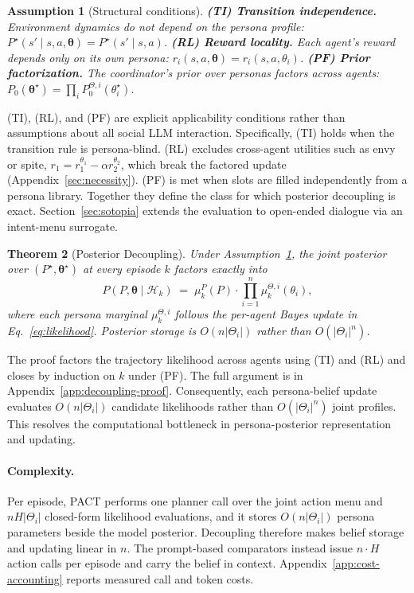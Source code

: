 \documentclass[letterpaper]{article} %
\newtheorem{theorem}{Theorem}[section]
\newtheorem{assumption}[theorem]{Assumption}
\begin{document}
\begin{assumption}[Structural conditions]
\label{ass:struct}
\textbf{(TI) Transition independence.} Environment dynamics do not depend on the persona profile: $P^\star(s' \mid s, a, \boldsymbol\theta) = P^\star(s' \mid s, a)$.
\textbf{(RL) Reward locality.} Each agent's reward depends only on its own persona: $r_i(s, a, \boldsymbol\theta) = r_i(s, a, \theta_i)$.
\textbf{(PF) Prior factorization.} The coordinator's prior over personas factors across agents: $P_0(\boldsymbol\theta^\star) = \prod_i P_0^{\Theta,i}(\theta_i^\star)$.
\end{assumption}

(TI), (RL), and (PF) are explicit applicability conditions rather than assumptions about all social LLM interaction. Specifically, (TI) holds when the transition rule is persona-blind. (RL) excludes cross-agent utilities such as envy or spite, $r_1 = r_1^{\theta_1} - \alpha r_2^{\theta_2}$, which break the factored update (Appendix~\ref{sec:necessity}). (PF) is met when slots are filled independently from a persona library. Together they define the class for which posterior decoupling is exact. Section~\ref{sec:sotopia} extends the evaluation to open-ended dialogue via an intent-menu surrogate.

\begin{theorem}[Posterior Decoupling]
\label{thm:decoupling-main}
Under Assumption~\ref{ass:struct}, the joint posterior over $(P^\star, \boldsymbol\theta^\star)$ at every episode $k$ factors exactly into
\[
P(P, \boldsymbol\theta \mid \mathcal{H}_k) \;=\; \mu_k^P(P) \cdot \prod_{i=1}^n \mu_k^{\Theta,i}(\theta_i),
\]
where each persona marginal $\mu_k^{\Theta,i}$ follows the per-agent Bayes update in Eq.~\eqref{eq:likelihood}. Posterior storage is $O(n|\Theta_i|)$ rather than $O(|\Theta_i|^n)$.
\end{theorem}

The proof factors the trajectory likelihood across agents using (TI) and (RL) and closes by induction on $k$ under (PF). The full argument is in Appendix~\ref{app:decoupling-proof}. Consequently, each persona-belief update evaluates $O(n|\Theta_i|)$ candidate likelihoods rather than $O(|\Theta_i|^n)$ joint profiles. This resolves the computational bottleneck in persona-posterior representation and updating.

\paragraph{Complexity.} Per episode, PACT performs one planner call over the joint action menu and $nH|\Theta_i|$ closed-form likelihood evaluations, and it stores $O(n|\Theta_i|)$ persona parameters beside the model posterior. Decoupling therefore makes belief storage and updating linear in $n$. The prompt-based comparators instead issue $n\cdot H$ action calls per episode and carry the belief in context. Appendix~\ref{app:cost-accounting} reports measured call and token costs.
\end{document}
